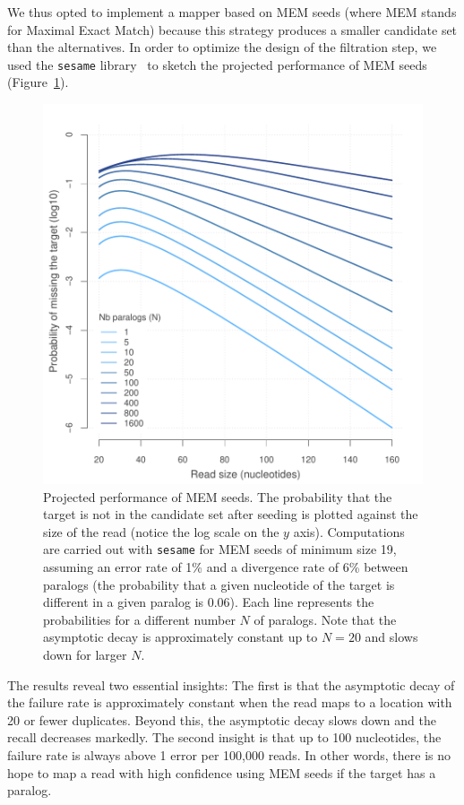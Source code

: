 \documentclass[a4,center,fleqn]{NAR}
\begin{document}
We thus opted to implement a mapper based on MEM seeds (where MEM stands
for Maximal Exact Match) because this strategy produces a smaller
candidate set than the alternatives. In order to optimize the design of
the filtration step, we used the \texttt{sesame}
library~\cite{Filion619155} to sketch the projected performance of MEM
seeds (Figure~\ref{fig_MEM}).

\begin{figure}[t]
\begin{center}
\includegraphics[scale=.6]{MEM_19.pdf}
\end{center}
\caption{Projected performance of MEM seeds. The probability that the
target is not in the candidate set after seeding  is plotted against the
size of the read (notice the log scale on the $y$ axis). Computations are
carried out with \texttt{sesame} for MEM seeds of minimum size 19,
assuming an error rate of 1\% and a divergence rate of 6\% between
paralogs (the probability that a given nucleotide of the target is
different in a given paralog is 0.06). Each line represents the
probabilities for a different number $N$ of paralogs. Note that the
asymptotic decay is approximately constant up to $N = 20$ and slows down
for larger $N$.}
\label{fig_MEM}
\end{figure}

The results reveal two essential insights: The first is that the
asymptotic decay of the failure rate is approximately constant when the
read maps to a location with 20 or fewer duplicates. Beyond this, the
asymptotic decay slows down and the recall decreases markedly. The second
insight is that up to 100 nucleotides, the failure rate is always above 1
error per 100,000 reads. In other words, there is no hope to map a read
with high confidence using MEM seeds if the target has a paralog.
\end{document}
